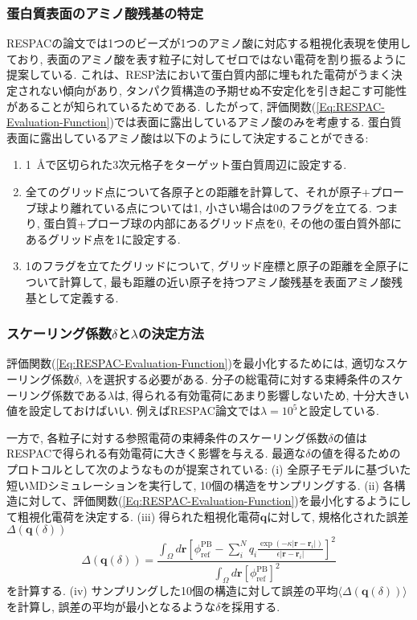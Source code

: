 \subsubsection{蛋白質表面のアミノ酸残基の特定}
RESPACの論文では1つのビーズが1つのアミノ酸に対応する粗視化表現を使用しており, 表面のアミノ酸を表す粒子に対してゼロではない電荷を割り振るように提案している.
これは、RESP法において蛋白質内部に埋もれた電荷がうまく決定されない傾向があり, タンパク質構造の予期せぬ不安定化を引き起こす可能性があることが知られているためである.
したがって, 評価関数(\ref{Eq:RESPAC-Evaluation-Function})では表面に露出しているアミノ酸のみを考慮する.
蛋白質表面に露出しているアミノ酸は以下のようにして決定することができる:
\begin{enumerate}
    \item 1~{\AA}で区切られた3次元格子をターゲット蛋白質周辺に設定する.
    \item 全てのグリッド点について各原子との距離を計算して、それが原子+プローブ球より離れている点については1, 小さい場合は0のフラグを立てる. つまり, 蛋白質+プローブ球の内部にあるグリッド点を0, その他の蛋白質外部にあるグリッド点を1に設定する.
    \item 1のフラグを立てたグリッドについて, グリッド座標と原子の距離を全原子について計算して, 最も距離の近い原子を持つアミノ酸残基を表面アミノ酸残基として定義する.
\end{enumerate}


\subsubsection{スケーリング係数$\delta$と$\lambda$の決定方法}
評価関数(\ref{Eq:RESPAC-Evaluation-Function})を最小化するためには, 適切なスケーリング係数$\delta$, $\lambda$を選択する必要がある.
分子の総電荷に対する束縛条件のスケーリング係数である$\lambda$は, 得られる有効電荷にあまり影響しないため, 十分大きい値を設定しておけばいい. 例えばRESPAC論文では$\lambda = 10^{5}$と設定している.

一方で, 各粒子に対する参照電荷の束縛条件のスケーリング係数$\delta$の値はRESPACで得られる有効電荷に大きく影響を与える.
最適な$\delta$の値を得るためのプロトコルとして次のようなものが提案されている:
(i) 全原子モデルに基づいた短いMDシミュレーションを実行して, 10個の構造をサンプリングする.
(ii) 各構造に対して、評価関数(\ref{Eq:RESPAC-Evaluation-Function})を最小化するようにして粗視化電荷を決定する.
(iii) 得られた粗視化電荷$\bm{q}$に対して, 規格化された誤差$\Delta (\bm{q}(\delta))$
\begin{equation}
    \Delta (\bm{q}(\delta))
    =
    \frac
    {\int_{\Omega} d\bm{r}
        \left[
            \phi_{\mathrm{ref}}^{\mathrm{PB}}
            -
            \sum_{i}^{N} q_{i}
            \frac{\exp(-\kappa |\bm{r} - \bm{r}_{i}|)}{\epsilon |\bm{r} - \bm{r}_{i}|}
        \right]^{2}
    }
    {
        \int_{\Omega} d\bm{r}[\phi_{\mathrm{ref}}^{\mathrm{PB}}]^{2}
    }
\end{equation}
を計算する.
(iv) サンプリングした10個の構造に対して誤差の平均$\langle \Delta (\bm{q}(\delta)) \rangle$を計算し, 誤差の平均が最小となるような$\delta$を採用する.

